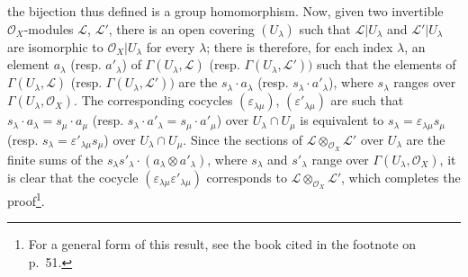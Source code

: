 \begin{env}[5.4.7]
the bijection thus defined is a group homomorphism. Now, given
two invertible $\mathcal{O}_X$-modules $\mathcal{L}$, $\mathcal{L}'$, there is
an open covering $(U_\lambda)$ such that $\mathcal{L}|U_\lambda$ and
$\mathcal{L}'|U_\lambda$ are isomorphic to $\mathcal{O}_X|U_\lambda$ for
every $\lambda$; there is therefore, for each index $\lambda$, an element
$a_\lambda$ (resp. $a'_\lambda$) of $\Gamma(U_\lambda,\mathcal{L})$ (resp.
$\Gamma(U_\lambda,\mathcal{L}'))$ such that the elements of
$\Gamma(U_\lambda,\mathcal{L})$ (resp. $\Gamma(U_\lambda,\mathcal{L}'))$
are the $s_\lambda\cdot a_\lambda$ (resp.
$s_\lambda\cdot a'_\lambda$), where $s_\lambda$ ranges over
$\Gamma(U_\lambda,\mathcal{O}_X)$. The corresponding cocycles
$(\varepsilon_{\lambda\mu})$, $(\varepsilon'_{\lambda\mu})$ are such that
$s_\lambda\cdot a_\lambda=s_\mu\cdot a_\mu$ (resp.
$s_\lambda\cdot a'_\lambda=s_\mu\cdot a'_\mu$) over
$U_\lambda\cap U_\mu$ is equivalent to
$s_\lambda=\varepsilon_{\lambda\mu}s_\mu$ (resp.
$s_\lambda=\varepsilon'_{\lambda\mu}s_\mu$) over
$U_\lambda\cap U_\mu$. Since the sections of
$\mathcal{L}\otimes_{\mathcal{O}_X}\mathcal{L}'$ over $U_\lambda$
are the finite sums of the
$s_\lambda s'_\lambda\cdot(a_\lambda\otimes a'_\lambda)$, where $s_\lambda$ and
$s'_\lambda$ range over $\Gamma(U_\lambda,\mathcal{O}_X)$, it is clear that
the cocycle $(\varepsilon_{\lambda\mu}\varepsilon'_{\lambda\mu})$ corresponds
to $\mathcal{L}\otimes_{\mathcal{O}_X}\mathcal{L}'$, which completes the
proof\footnote{For a general form of this result, see the book
cited in the footnote on p.~51.}.
\end{env}

